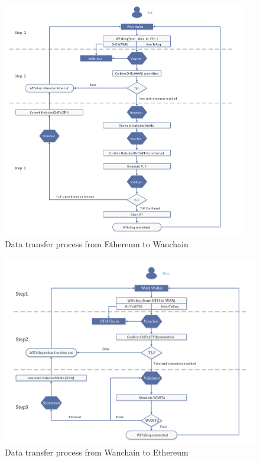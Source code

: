         \begin{figure}[H]
        \includegraphics[width=0.96\textwidth]{./figures/ethtowan.png}
        \centering
        \caption{{Data transfer process from Ethereum to Wanchain}\protect\footnotemark}
        \centering
        \label{fig:wan1}
        
        \end{figure}
        \begin{figure}[H]
        \includegraphics[width=1\textwidth]{./figures/wantoeth.png}
        \centering
        \caption{{Data transfer process from Wanchain to Ethereum}\protect\footnotemark}
        \centering
        \label{fig:wan2}
        
        \end{figure}

